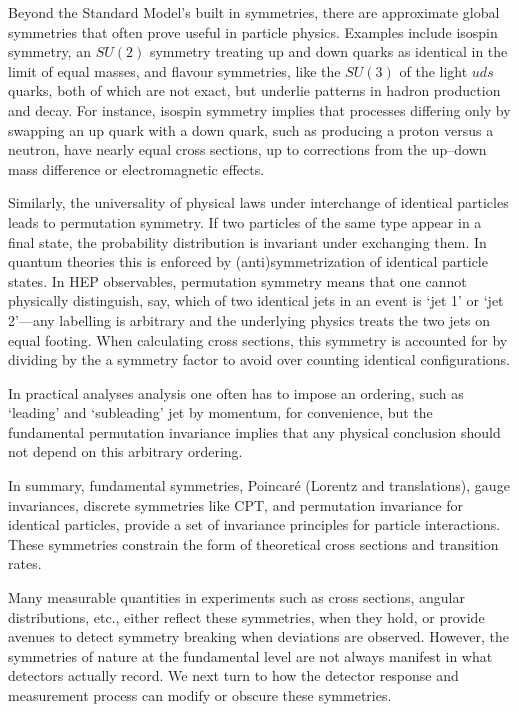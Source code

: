         Beyond the Standard Model’s built in symmetries, there are approximate global symmetries that often prove useful in particle physics.
        Examples include isospin symmetry, an $SU(2)$ symmetry treating up and down quarks as identical in the limit of equal masses, and flavour symmetries, like the $SU(3)$ of the light $uds$ quarks, both of which are not exact, but underlie patterns in hadron production and decay.
        For instance, isospin symmetry implies that processes differing only by swapping an up quark with a down quark, such as producing a proton versus a neutron, have nearly equal cross sections, up to corrections from the up--down mass difference or electromagnetic effects.
        
        Similarly, the universality of physical laws under interchange of identical particles leads to permutation symmetry.
        If two particles of the same type appear in a final state, the probability distribution is invariant under exchanging them.
        In quantum theories this is enforced by (anti)symmetrization of identical particle states.
            In HEP observables, permutation symmetry means that one cannot physically distinguish, say, which of two identical jets in an event is `jet 1' or `jet 2'---any labelling is arbitrary and the underlying physics treats the two jets on equal footing.
            When calculating cross sections, this symmetry is accounted for by dividing by the a symmetry factor to avoid over counting identical configurations.
            
            In practical analyses analysis one often has to impose an ordering, such as `leading' and `subleading' jet by momentum, for convenience, but the fundamental permutation invariance implies that any physical conclusion should not depend on this arbitrary ordering.

            In summary, fundamental symmetries, Poincar\'e (Lorentz and translations), gauge invariances, discrete symmetries like CPT, and permutation invariance for identical particles, provide a set of invariance principles for particle interactions.
            These symmetries constrain the form of theoretical cross sections and transition rates.
            
            Many measurable quantities in experiments such as cross sections, angular distributions, etc., either reflect these symmetries, when they hold, or provide avenues to detect symmetry breaking when deviations are observed.
            However, the symmetries of nature at the fundamental level are not always manifest in what detectors actually record.
            We next turn to how the detector response and measurement process can modify or obscure these symmetries.

